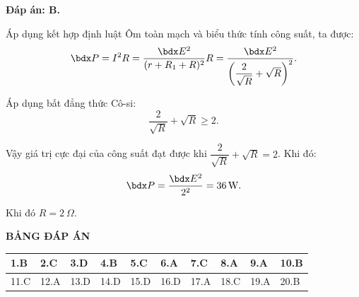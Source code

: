 \begin{enumerate}[label=\bfseries Câu \arabic*:]
{	}
	\loigiai
	{	\textbf{Đáp án: B.}
		
		Áp dụng kết hợp định luật Ôm toàn mạch và biểu thức tính công suất, ta được:
		$$\calP = I^2 R = \dfrac{\calE^2}{(r + R_1 + R)^2}R = \dfrac{\calE ^2}{\left(\dfrac{2}{\sqrt{R}} + \sqrt{R}\right)^2}.$$
		
		Áp dụng bất đẳng thức Cô-si:
		$$\dfrac{2}{\sqrt{R}} + \sqrt{R} \geq 2.$$
		
		Vậy giá trị cực đại của công suất đạt được khi $\dfrac{2}{\sqrt{R}} + \sqrt{R} = 2$. Khi đó:
		$$\calP = \dfrac{\calE^2}{2^2} = \SI{36}{W}.$$
		
		Khi đó $R=\SI{2}{\Omega}$.
	}
\end{enumerate}

\whiteBGstarEnd

\loigiai
{
	\begin{center}
		\textbf{BẢNG ĐÁP ÁN}
	\end{center}
	\begin{center}
		\begin{tabular}{|m{2.8em}|m{2.8em}|m{2.8em}|m{2.8em}|m{2.8em}|m{2.8em}|m{2.8em}|m{2.8em}|m{2.8em}|m{2.8em}|}
			\hline
			1.B  & 2.C  & 3.D  & 4.B  & 5.C  & 6.A  & 7.C  & 8.A  & 9.A  & 10.B  \\
			\hline
			11.C  & 12.A  & 13.D  & 14.D  & 15.D  & 16.D  & 17.A  & 18.C  & 19.A  & 20.B  \\
			\hline
		\end{tabular}
	\end{center}
}
